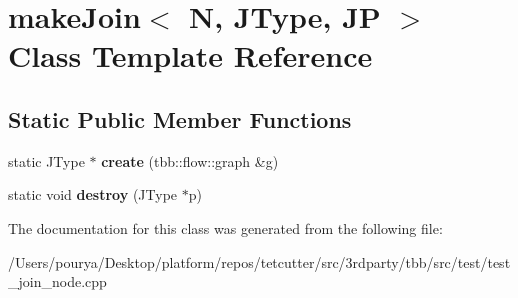 \hypertarget{classmakeJoin}{}\section{make\+Join$<$ N, J\+Type, J\+P $>$ Class Template Reference}
\label{classmakeJoin}
\subsection*{Static Public Member Functions}
\begin{DoxyCompactItemize}
\item 
\hypertarget{classmakeJoin_a73fc3ff5fb699cb42f7b294af1649bdd}{}static J\+Type $\ast$ {\bfseries create} (tbb\+::flow\+::graph \&g)\label{classmakeJoin_a73fc3ff5fb699cb42f7b294af1649bdd}

\item 
\hypertarget{classmakeJoin_ab52c342adad1dd486fb9d31d7fb67331}{}static void {\bfseries destroy} (J\+Type $\ast$p)\label{classmakeJoin_ab52c342adad1dd486fb9d31d7fb67331}

\end{DoxyCompactItemize}


The documentation for this class was generated from the following file\+:\begin{DoxyCompactItemize}
\item 
/\+Users/pourya/\+Desktop/platform/repos/tetcutter/src/3rdparty/tbb/src/test/test\+\_\+join\+\_\+node.\+cpp\end{DoxyCompactItemize}
